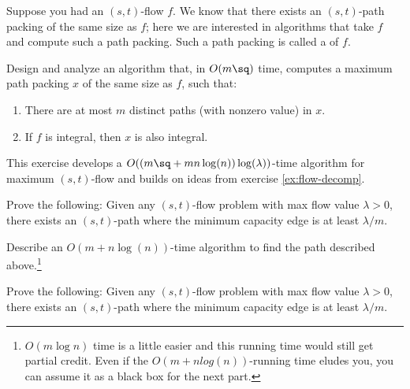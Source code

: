 \documentclass{article}
\begin{document}
\setcounter{section}{18}
\setcounter{exercise}{2}
\begin{exercise} \label{ex:flow-decomp}
  Suppose you had an \( (s, t) \)-flow \( f \).
  We know that there exists an \( (s,t) \)-path packing of the same size as \( f \); here we are interested in algorithms that take \( f \) and compute such a path packing.
  Such a path packing is called a  of \( f \).

  Design and analyze an algorithm that, in \( O(m\sq) \) time, computes a maximum path packing \( x \) of the same size as \( f \), such that:
  \begin{enumerate}
    \item There are at most \( m \) distinct paths (with nonzero value) in \( x \).
    \item If \( f \) is integral, then \( x \) is also integral.
  \end{enumerate}
\end{exercise}

\begin{solution}

\end{solution}
\pagebreak

 This exercise develops a \( O((m\sq + mn\log(n))\log(\lambda)) \)-time algorithm for maximum \( (s,t) \)-flow and builds on ideas from exercise \ref{ex:flow-decomp}.

\begin{subexercise}
  Prove the following: Given any \( (s, t) \)-flow problem with max flow value \( \lambda > 0 \), there exists an \( (s, t) \)-path where the minimum capacity edge is at least \( \lambda/m \).
\end{subexercise}

\begin{solution}

\end{solution}
\pagebreak

\begin{subexercise}
  Describe an \( O(m+n\log(n)) \)-time algorithm to find the path described above.\footnote[4]{\( O(m\log n) \) time is a little easier and this running time would still get partial credit.
    Even if the \( O(m + n log(n)) \)-running time eludes you, you can assume it as a black box for the next part.}
\end{subexercise}

\begin{solution}

\end{solution}
\pagebreak

\begin{subexercise}
  Prove the following: Given any \( (s, t) \)-flow problem with max flow value \( \lambda > 0 \), there exists an \( (s, t) \)-path where the minimum capacity edge is at least \( \lambda/m \).
\end{subexercise}

\begin{solution}

\end{solution}
\pagebreak
\end{document}
